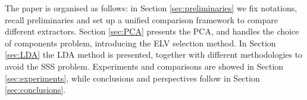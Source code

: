 The paper is organised as follows: in Section \ref{sec:preliminaries} we fix notations, recall preliminaries and set up a unified comparison framework to compare different extractors. Section \ref{sec:PCA} presents the PCA, and handles the choice of components problem, introducing the  ELV selection method. In Section \ref{sec:LDA} the LDA method is presented, together with different methodologies to avoid the SSS problem. Experiments and comparisons are showed in Section \ref{sec:experiments}, while conclusions and perspectives follow in Section \ref{sec:conclusions}. 